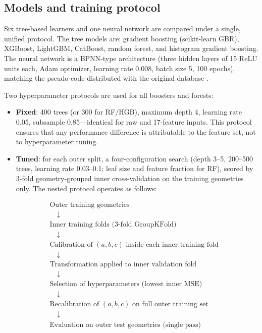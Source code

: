 \documentclass[12pt]{article}
\begin{document}
\subsection{Models and training protocol}
Six tree-based learners and one neural network are compared under a single, unified protocol. The tree models are: gradient boosting (scikit-learn GBR), XGBoost, LightGBM, CatBoost, random forest, and histogram gradient boosting. The neural network is a BPNN-type architecture (three hidden layers of 15 ReLU units each, Adam optimizer, learning rate 0.008, batch size 5, 100 epochs), matching the pseudo-code distributed with the original database \cite{bregolin}.

Two hyperparameter protocols are used for all boosters and forests:
\begin{itemize}[noitemsep]
\item \textbf{Fixed}: 400 trees (or 300 for RF/HGB), maximum depth 4, learning rate 0.05, subsample 0.85---identical for raw and 17-feature inputs. This protocol ensures that any performance difference is attributable to the feature set, not to hyperparameter tuning.
\item \textbf{Tuned}: for each outer split, a four-configuration search (depth 3--5, 200--500 trees, learning rate 0.03--0.1; leaf size and feature fraction for RF), scored by 3-fold geometry-grouped inner cross-validation on the training geometries only. The nested protocol operates as follows:
\end{itemize}

\begin{equation}
\begin{aligned}
&\text{Outer training geometries} \\
&\quad\downarrow \\
&\text{Inner training folds (3-fold GroupKFold)} \\
&\quad\downarrow \\
&\text{Calibration of } (a, b, c) \text{ inside each inner training fold} \\
&\quad\downarrow \\
&\text{Transformation applied to inner validation fold} \\
&\quad\downarrow \\
&\text{Selection of hyperparameters (lowest inner MSE)} \\
&\quad\downarrow \\
&\text{Recalibration of } (a, b, c) \text{ on full outer training set} \\
&\quad\downarrow \\
&\text{Evaluation on outer test geometries (single pass)}
\end{aligned}
\label{eq:nested}
\end{equation}
\end{document}
